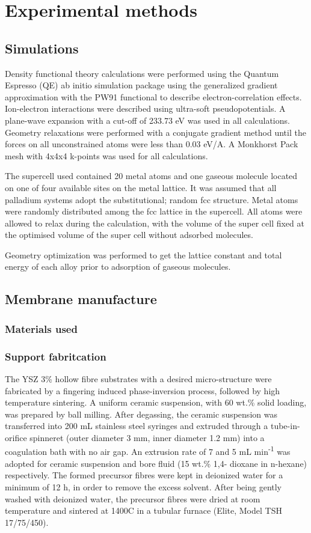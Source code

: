 \chapter{Experimental methods}



\section{Simulations}
Density functional theory calculations were performed using the Quantum Espresso (QE) ab initio simulation package using the generalized gradient approximation with the PW91 functional to describe electron-correlation effects. Ion-electron interactions were described using ultra-soft pseudopotentials. A plane-wave expansion with a cut-off of 233.73 eV was used in all calculations. Geometry relaxations were performed with a conjugate gradient method until the forces on all unconstrained atoms were less than 0.03 eV/A. A Monkhorst Pack mesh with 4x4x4 k-points was used for all calculations.

The supercell used contained 20 metal atoms and one gaseous molecule located on one of four available sites on the metal lattice. It was assumed that all palladium systems adopt the substitutional; random fcc structure. Metal atoms were randomly distributed among the fcc lattice in the supercell. All atoms were allowed to relax during the calculation, with the volume of the super cell fixed at the optimised volume of the super cell without adsorbed molecules. 

Geometry optimization was performed to get the lattice constant and total energy of each alloy prior to adsorption of gaseous molecules. 

\section{Membrane manufacture}

\subsection{Materials used}
\subsection{Support fabritcation}
The YSZ 3\% hollow fibre substrates with a desired micro-structure were fabricated by a fingering induced phase-inversion process, followed by high temperature sintering. A uniform ceramic suspension, with 60 wt.\% solid loading, was prepared by ball milling. After degassing, the ceramic suspension was transferred into 200 mL stainless steel syringes and extruded through a tube-in-orifice spinneret (outer diameter 3 mm, inner diameter 1.2 mm) into a coagulation bath with no air gap. An extrusion rate of 7 and 5 mL min\textsuperscript{-1} was adopted for ceramic suspension and bore fluid (15 wt.\% 1,4- dioxane in n-hexane) respectively. The formed precursor fibres were kept in deionized water for a minimum of 12 h, in order to remove the excess solvent. After being gently washed with deionized water, the precursor fibres were dried at room temperature and sintered at 1400\textdegree C in a tubular furnace (Elite, Model TSH 17/75/450).
